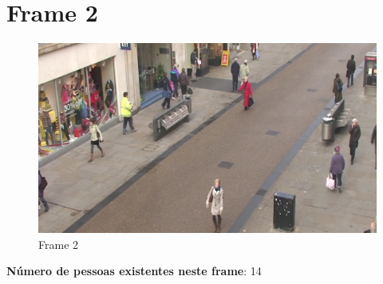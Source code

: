 \newpage
\section{Frame 2}

\begin{figure}[h]
	\centering
	\includegraphics[width=0.5\linewidth]{img/vision/frame2.png}
	\caption{Frame 2 }
	\label{db}
\end{figure}

\textbf{Número de pessoas existentes neste frame}: 14


